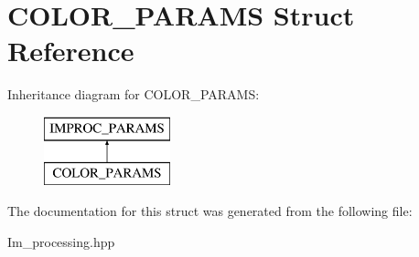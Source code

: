 \hypertarget{struct_c_o_l_o_r___p_a_r_a_m_s}{\section{C\+O\+L\+O\+R\+\_\+\+P\+A\+R\+A\+M\+S Struct Reference}
\label{struct_c_o_l_o_r___p_a_r_a_m_s}
}
Inheritance diagram for C\+O\+L\+O\+R\+\_\+\+P\+A\+R\+A\+M\+S\+:\begin{figure}[H]
\begin{center}
\leavevmode
\includegraphics[height=2.000000cm]{struct_c_o_l_o_r___p_a_r_a_m_s}
\end{center}
\end{figure}


The documentation for this struct was generated from the following file\+:\begin{DoxyCompactItemize}
\item 
Im\+\_\+processing.\+hpp\end{DoxyCompactItemize}
